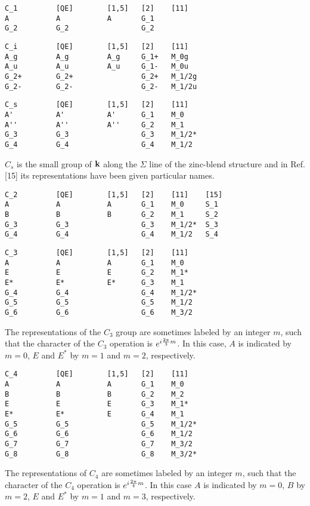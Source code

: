 \documentclass[12pt,a4paper]{article}
\begin{document}
\begin{verbatim}
C_1         [QE]        [1,5]   [2]    [11]
A           A           A       G_1             
G_2         G_2                 G_2              
\end{verbatim}

\begin{verbatim}
C_i         [QE]        [1,5]   [2]    [11] 
A_g         A_g         A_g     G_1+   M_0g
A_u         A_u         A_u     G_1-   M_0u
G_2+        G_2+                G_2+   M_1/2g
G_2-        G_2-                G_2-   M_1/2u
\end{verbatim}

\begin{verbatim}
C_s         [QE]        [1,5]   [2]    [11] 
A'          A'          A'      G_1    M_0
A''         A''         A''     G_2    M_1
G_3         G_3                 G_3    M_1/2*
G_4         G_4                 G_4    M_1/2
\end{verbatim}

$C_s$ is the small group of ${\bf k}$ along the $\Sigma$ line of the 
zinc-blend structure and in Ref.[15] its representations have been given
particular names.
\begin{verbatim}
C_2         [QE]        [1,5]   [2]    [11]    [15]  
A           A           A       G_1    M_0     S_1
B           B           B       G_2    M_1     S_2
G_3         G_3                 G_3    M_1/2*  S_3
G_4         G_4                 G_4    M_1/2   S_4
\end{verbatim}

\begin{verbatim}
C_3         [QE]        [1,5]   [2]    [11]
A           A           A       G_1    M_0
E           E           E       G_2    M_1*
E*          E*          E*      G_3    M_1
G_4         G_4                 G_4    M_1/2*
G_5         G_5                 G_5    M_1/2
G_6         G_6                 G_6    M_3/2
\end{verbatim}
The representations of the $C_3$ group are sometimes labeled by an integer 
$m$, such that the character of the $C_3$ operation is 
$e^{i {2\pi \over 3} m}$. In this case, $A$ is indicated by $m=0$, $E$ and 
$E^*$ by $m=1$ and $m=2$, respectively.

\begin{verbatim}
C_4         [QE]        [1,5]   [2]    [11]
A           A           A       G_1    M_0
B           B           B       G_2    M_2
E           E           E       G_3    M_1*
E*          E*          E       G_4    M_1
G_5         G_5                 G_5    M_1/2*
G_6         G_6                 G_6    M_1/2
G_7         G_7                 G_7    M_3/2 
G_8         G_8                 G_8    M_3/2*
\end{verbatim}
The representations of $C_4$ are sometimes labeled by an integer $m$,
such that the character of the $C_4$ operation is $e^{i {2\pi \over 4} m}$.
In this case $A$ is indicated by $m=0$, $B$ by $m=2$, $E$ and $E^*$ 
by $m=1$ and $m=3$, respectively.
\end{document}
